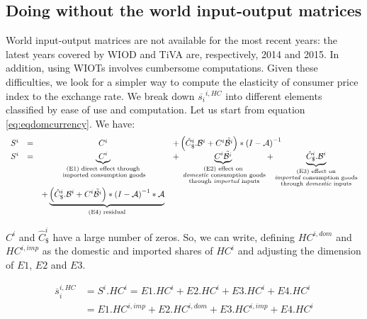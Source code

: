 \documentclass[11pt,a4paper]{article}
\begin{document}
\subsection{Doing without the world input-output matrices}
World input-output matrices are not available for the most recent years: the latest years covered by WIOD and TiVA are, respectively, 2014 and 2015. 
In addition, using WIOTs involves cumbersome computations.
Given these difficulties, we look for a simpler way to compute the elasticity of consumer price index to the exchange rate.
We break down $\overline{s_{i}}^{i,HC}$ into different elements classified by ease of use and computation.
Let us start from equation \ref{eq:eqdomcurrency}.
We have:
\begin{equation}
\begin{array}{lccl}
	S^ i&=&C^i	&+ \left(\hat{C}^i_\$.{\cal B}^i+{C^i}{\tilde{{\cal B}^i}}\right)*{{(I-{\cal A})}^{-1}} \\
	S^i &=&\underbrace{C^i}_{\substack{\text{(E1) direct effect through} \\ \text{ imported consumption goods}}}&+ \underbrace{{C^i}{\tilde{{\cal B}^i}}}_{\substack{\text{(E2) effect on} \\ \text{ \emph{domestic} consumption goods} \\ \text{ through \emph{imported} inputs}}}  + \underbrace{\hat{C}^i_\$.{\cal B}^i}_{\substack{\text{(E3)  effect on} \\ \text{\emph{imported} consumption goods} \\ \text{through \emph{domestic} inputs}}} \\ &&+\underbrace {\left( \hat{C}^i_\$.{\cal B}^i + {C^i}{\tilde{{\cal B}^i}}\right)*{{(I-{\cal A})}^{-1}}*{\cal A}}_{\text{(E4) residual}} \\
\end{array}
\label{eq:decomp}
\end{equation}


$C^i$ and $\hat{C}^i_\$$ have a large number of zeros. So, we can write, defining $HC^{i,dom}$ and $HC^{i,imp}$ as the domestic and imported shares of $HC^i$ and adjusting the dimension of $E1$, $E2$ and $E3$.

\begin{equation}
\begin{array}{lccl}
\overline{s}_{i}^{i,HC}&=S^i.HC^i=E1.HC^i+E2.HC^i+E3.HC^i+E4.HC^i \\
&=E1.HC^{i,imp}+E2.HC^{i,dom}+E3.HC^{i,imp}+E4.HC^i
 \end{array} 
 \label{eq:eqtoto}
 \end{equation}
 
\end{document}
